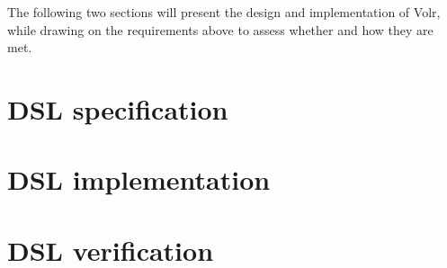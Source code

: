\documentclass[report.tex]{subfiles}
\begin{document}
The following two sections will present the design and implementation of
Volr, while drawing on the requirements above to assess whether and
how they are met.

\section{DSL specification} \label{sec:volr}


\section{DSL implementation} \label{sec:implementation}


\section{DSL verification} \label{sec:verification}

\end{document}
